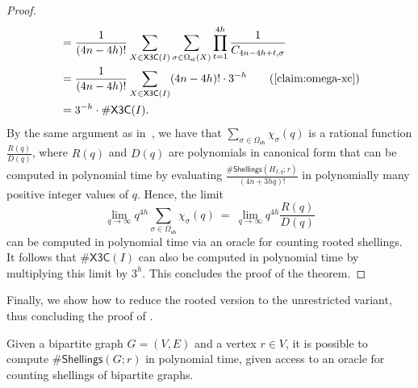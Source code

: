 \documentclass[11pt]{amsart}
\newcommand{\omsh}{\Omega_{\mathsf{sh}}}
\newcommand{\omxc}{\Omega_{\mathsf{xc}}}
\begin{document}
\begin{proof}
\begin{align*}
    &= \frac{1}{(4n-4h)!}\sum_{X \in \mathsf{X3C}(I)} \sum_{\sigma \in \omxc(X)} \prod_{t=1}^{4h}\frac{1}{C_{4n-4h+t,\sigma}}\\
    &= \frac{1}{(4n-4h)!}\sum_{X \in \mathsf{X3C}(I)} (4n-4h)! \cdot 3^{-h} \tag{\Cref{claim:omega-xc}}\\
    &= 3^{-h} \cdot \#\mathsf{X3C}(I).
\end{align*}
By the same argument as in~, we have that
\(
\sum_{\sigma \in \omsh} \chi_{\sigma}(q)
\)
is a rational function \(\frac{R(q)}{D(q)}\), where \(R(q)\) and \(D(q)\) are polynomials in canonical form that can be computed in polynomial time by evaluating 
$\frac{\#\mathsf{Shellings}(H_{I,q};r)}{(4n+3hq)!}$ in polynomially many positive integer values of $q$. Hence, the limit
\[
\lim_{q\to\infty} q^{4h}\sum_{\sigma \in \omsh} \chi_{\sigma}(q) \ = \
\lim_{q\to\infty} q^{4h}\frac{R(q)}{D(q)}
\]
can be computed in polynomial time via an oracle for counting rooted shellings. It follows that \(\#\mathsf{X3C}(I)\) can also be computed in polynomial time by multiplying this limit by \(3^h\). This concludes the proof of the theorem.
\end{proof}

Finally, we show how to reduce the rooted version to the unrestricted variant, thus concluding the proof of .

\begin{proposition}\label{prop:unrooting_shellings}
Given a bipartite graph $G = (V, E)$ and a vertex $r \in V$, it is possible to compute $\#\mathsf{Shellings}(G; r)$ in polynomial time, given access to an oracle for counting shellings of bipartite graphs.
\end{proposition}
\end{document}
